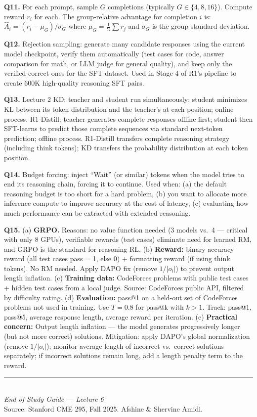\documentclass[11pt, a4paper]{article}
\begin{document}
\textbf{Q11.} For each prompt, sample $G$ completions (typically $G \in \{4, 8, 16\}$). Compute reward $r_i$ for each. The group-relative advantage for completion $i$ is: $\hat{A}_i = (r_i - \mu_G)/\sigma_G$ where $\mu_G = \frac{1}{G}\sum r_j$ and $\sigma_G$ is the group standard deviation.

\textbf{Q12.} Rejection sampling: generate many candidate responses using the current model checkpoint, verify them automatically (test cases for code, answer comparison for math, or LLM judge for general quality), and keep only the verified-correct ones for the SFT dataset. Used in Stage 4 of R1's pipeline to create 600K high-quality reasoning SFT pairs.

\textbf{Q13.} Lecture 2 KD: teacher and student run simultaneously; student minimizes KL between its token distribution and the teacher's at each position; online process. R1-Distill: teacher generates complete responses offline first; student then SFT-learns to predict those complete sequences via standard next-token prediction; offline process. R1-Distill transfers complete reasoning strategy (including think tokens); KD transfers the probability distribution at each token position.

\textbf{Q14.} Budget forcing: inject ``Wait'' (or similar) tokens when the model tries to end its reasoning chain, forcing it to continue. Used when: (a) the default reasoning budget is too short for a hard problem, (b) you want to allocate more inference compute to improve accuracy at the cost of latency, (c) evaluating how much performance can be extracted with extended reasoning.

\textbf{Q15.} (a) \textbf{GRPO.} Reasons: no value function needed (3 models vs.\ 4 --- critical with only 8 GPUs), verifiable rewards (test cases) eliminate need for learned RM, and GRPO is the standard for reasoning RL. (b) \textbf{Reward:} binary accuracy reward (all test cases pass = 1, else 0) + formatting reward (if using think tokens). No RM needed. Apply DAPO fix (remove $1/|o_i|$) to prevent output length inflation. (c) \textbf{Training data:} CodeForces problems with public test cases + hidden test cases from a local judge. Source: CodeForces public API, filtered by difficulty rating. (d) \textbf{Evaluation:} pass@1 on a held-out set of CodeForces problems not used in training. Use $T=0.8$ for pass@k with $k>1$. Track: pass@1, pass@5, average response length, average reward per iteration. (e) \textbf{Practical concern:} Output length inflation --- the model generates progressively longer (but not more correct) solutions. Mitigation: apply DAPO's global normalization (remove $1/|o_i|$); monitor average length of incorrect vs.\ correct solutions separately; if incorrect solutions remain long, add a length penalty term to the reward.

\vspace{1em}
\begin{center}
\rule{0.5\textwidth}{0.4pt}\\[6pt]
{\small\textit{End of Study Guide --- Lecture 6}}\\[4pt]
{\small Source: Stanford CME 295, Fall 2025. Afshine \& Shervine Amidi.}
\end{center}
\end{document}
